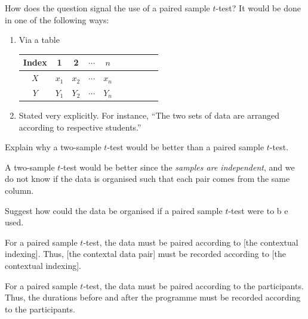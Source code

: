 \begin{note}
  How does the question signal the use of a paired sample \(t\)-test? It would be done in one of the following ways:
  \begin{enumerate}[label=(\alph*)]
    \item Via a table
    \begin{center}
      \begin{tabular}{|Sc|Sc|Sc|Sc|Sc|}
        \hline
         Index & 1 & 2 & \(\cdots\) & \(n\)\\
        \hline
        \(X\) & \(x_1\) & \(x_2\) & \(\cdots\) & \(x_n\)\\
        \hline
        \(Y\) & \(Y_1\) & \(Y_2\) & \(\cdots\) & \(Y_n\)\\
        \hline
      \end{tabular}
      \captionsetup{type=table}
      \label{table:table containing data of two paired samples}
    \end{center}
    \item Stated very explicitly. For instance, ``The two sets of data are arranged according to respective students.''
  \end{enumerate}
\end{note}
\begin{note}
  Explain why a two-sample \(t\)-test would be better than a paired sample \(t\)-test.
  \begin{center}
    \parbox{0.9\textwidth}{
      A two-sample \(t\)-test would be better since the \emph{samples are independent}, and we do not know if the data is organised such that each pair comes from the same column.
    }
  \end{center}
\end{note}
\begin{note}
  Suggest how could the data be organised if a paired sample \(t\)-test were to b e used.
  \begin{center}
    \parbox{0.9\textwidth}{
      For a paired sample \(t\)-test, the data must be paired according to [the contextual indexing]. Thus, [the contextal data pair] must be recorded according to [the contextual indexing].
    }
  \end{center}
\end{note}
\begin{example}{}{}
  For a paired sample \(t\)-test, the data must be paired according to the participants. Thus, the durations before and after the programme must be recorded according to the participants.
\end{example}

